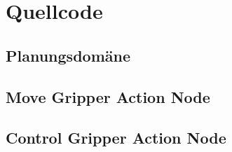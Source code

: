 \newpage
{} %
\listoftables
\newpage

\setlength{\parskip}{0.5em} 




\clearpage
{}  
    \setcounter{page}{1}
\lhead{\nouppercase{\leftmark}}

%





%
\clearpage
\lhead{}
\printbibliography
{}


\clearpage
\appendix
\section{Quellcode} %
\subsection{Planungsdomäne}

%
\subsection{Move Gripper Action Node}

\subsection{Control Gripper Action Node}


